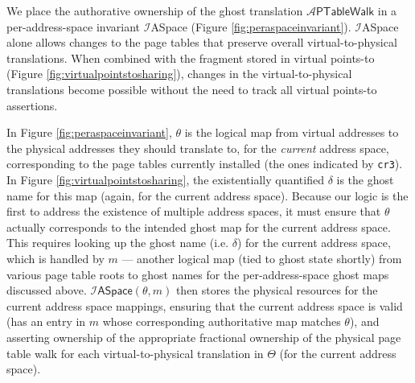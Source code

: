 We place the authorative ownership of the ghost translation $\mathcal{A}\textsf{PTableWalk}$ in a per-address-space invariant
$\mathcal{I}$\textsf{ASpace} (Figure \ref{fig:peraspaceinvariant}). 
$\mathcal{I}$\textsf{ASpace} alone allows changes to the page tables
that preserve overall virtual-to-physical translations.
When combined with the
fragment stored in virtual points-to (Figure \ref{fig:virtualpointstosharing}),
changes in the virtual-to-physical translations become possible without the need to track all virtual points-to assertions.

In Figure \ref{fig:peraspaceinvariant},
$\theta$ is the logical map from virtual addresses to the physical addresses they should translate to, 
for the \emph{current} address space, corresponding to the page tables currently installed (the ones
indicated by \lstinline|cr3|). In Figure \ref{fig:virtualpointstosharing}, the existentially quantified $\delta$
is the ghost name for this map (again, for the current address space).
Because our logic is the first to address the existence of multiple address spaces,
it must ensure that $\theta$ actually corresponds to the intended ghost map for the current address space.
This requires looking up the ghost name (i.e. $\delta$) for the current address space,
which is handled by $m$ --- another logical map (tied to ghost state shortly)
from various page table roots to ghost names for the per-address-space ghost maps discussed above.
$\mathcal{I}\textsf{ASpace}(\theta,m)$ then stores the physical resources for the current address space mappings,
ensuring that the current address space is valid (has an entry in $m$ whose corresponding
authoritative map matches $\theta$), and asserting ownership of the appropriate fractional ownership
of the physical page table walk for each virtual-to-physical translation in $\Theta$ (for the current address space).

